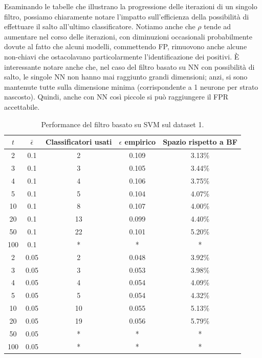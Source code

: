 Esaminando le tabelle che illustrano la progressione delle iterazioni di un singolo filtro, possiamo chiaramente notare l'impatto sull'efficienza della possibilità di effettuare il salto all'ultimo classificatore. 
Notiamo anche che $\rho$ tende ad aumentare nel corso delle iterazioni, con diminuzioni occasionali probabilmente dovute al fatto che alcuni modelli, commettendo FP, rimuovono anche alcune non-chiavi che ostacolavano particolarmente l'identificazione dei positivi.
È interessante notare anche che, nel caso del filtro basato su NN con possibilità di salto, le singole NN non hanno mai raggiunto grandi dimensioni; anzi, si sono mantenute tutte sulla dimensione minima (corrispondente a 1 neurone per strato nascosto). Quindi, anche con NN così piccole si può raggiungere il FPR accettabile.

\begin{table}
    \centering
    \begin{tabular}{|c|c|c|c|c|}
        \hline
        $t$ & $\bar\epsilon$ & Classificatori usati & $\epsilon$ empirico & Spazio rispetto a BF \\ 
        \hline
        2 & 0.1 & 2 & 0.109 & 3.13\% \\  
        3 & 0.1 & 3 & 0.105 & 3.44\% \\  
        4 & 0.1 & 4 & 0.106 & 3.75\% \\  
        5 & 0.1 & 5 & 0.104 & 4.07\% \\  
        10 & 0.1 & 8 & 0.107 & 4.00\% \\ 
        20 & 0.1 & 13 & 0.099 & 4.40\% \\ 
        50 & 0.1 & 22 & 0.101 & 5.20\% \\ 
        100 & 0.1 & * & * & * \\ 
        2 & 0.05 & 2 & 0.048 & 3.92\% \\  
        3 & 0.05 & 3 & 0.053 & 3.98\% \\  
        4 & 0.05 & 4 & 0.054 & 4.09\% \\  
        5 & 0.05 & 5 & 0.054 & 4.32\% \\  
        10 & 0.05 & 10 & 0.055 & 5.13\% \\ 
        20 & 0.05 & 19 & 0.056 & 5.79\% \\ 
        50 & 0.05 & * & * & * \\ 
        100 & 0.05 & * & * & * \\  
        \hline
    \end{tabular}
    \caption{Performance del filtro basato su SVM sul dataset 1.}
    \label{tab:performance-ds1-svm}
\end{table}
